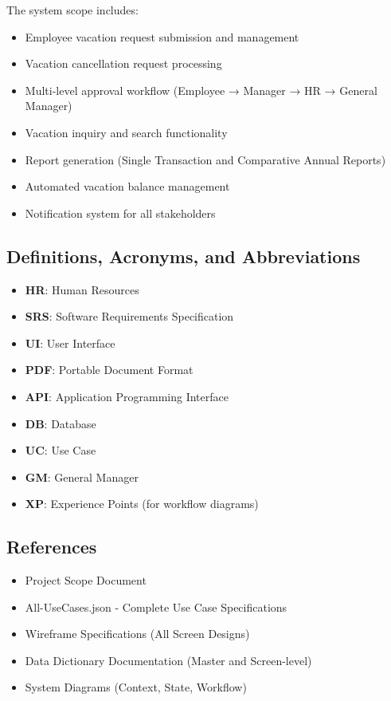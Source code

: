 \documentclass[12pt,a4paper]{article}
\begin{document}
The system scope includes:
\begin{itemize}
    \item Employee vacation request submission and management
    \item Vacation cancellation request processing
    \item Multi-level approval workflow (Employee → Manager → HR → General Manager)
    \item Vacation inquiry and search functionality
    \item Report generation (Single Transaction and Comparative Annual Reports)
    \item Automated vacation balance management
    \item Notification system for all stakeholders
\end{itemize}

\subsection{Definitions, Acronyms, and Abbreviations}
\begin{itemize}
    \item \textbf{HR}: Human Resources
    \item \textbf{SRS}: Software Requirements Specification
    \item \textbf{UI}: User Interface
    \item \textbf{PDF}: Portable Document Format
    \item \textbf{API}: Application Programming Interface
    \item \textbf{DB}: Database
    \item \textbf{UC}: Use Case
    \item \textbf{GM}: General Manager
    \item \textbf{XP}: Experience Points (for workflow diagrams)
\end{itemize}

\subsection{References}
\begin{itemize}
    \item Project Scope Document
    \item All-UseCases.json - Complete Use Case Specifications
    \item Wireframe Specifications (All Screen Designs)
    \item Data Dictionary Documentation (Master and Screen-level)
    \item System Diagrams (Context, State, Workflow)
\end{itemize}
\end{document}
